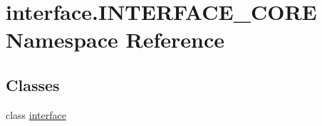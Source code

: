 \hypertarget{namespaceinterface_1_1INTERFACE__CORE}{}\section{interface.\+I\+N\+T\+E\+R\+F\+A\+C\+E\+\_\+\+C\+O\+R\+E Namespace Reference}
\label{namespaceinterface_1_1INTERFACE__CORE}
\subsection*{Classes}
\begin{DoxyCompactItemize}
\item 
class \hyperlink{classinterface_1_1INTERFACE__CORE_1_1interface}{interface}
\end{DoxyCompactItemize}
